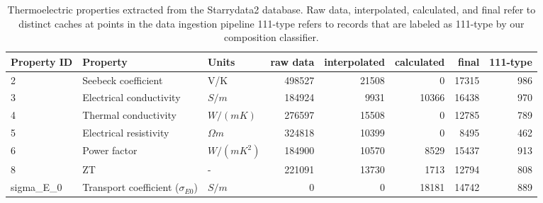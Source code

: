 \begin{table}
\centering
\caption{Thermoelectric properties extracted from the Starrydata2 database. Raw data, interpolated, calculated, and final refer to distinct caches at points in the data ingestion pipeline 111-type refers to records that are labeled as 111-type by our composition classifier.}
\label{table:prop_table}
\begin{tabular}{lllrrrrr}
\toprule
Property ID &                              Property &      Units &  raw data &  interpolated &  calculated &  final &  111-type \\
\midrule
          2 &                   Seebeck coefficient &        V/K &    498527 &         21508 &           0 &  17315 &       986 \\
          3 &               Electrical conductivity &      $S/m$ &    184924 &          9931 &       10366 &  16438 &       970 \\
          4 &                  Thermal conductivity &   $W/(mK)$ &    276597 &         15508 &           0 &  12785 &       789 \\
          5 &                Electrical resistivity & $\Omega m$ &    324818 &         10399 &           0 &   8495 &       462 \\
          6 &                          Power factor & $W/(mK^2)$ &    184900 &         10570 &        8529 &  15437 &       913 \\
          8 &                                    ZT &          - &    221091 &         13730 &        1713 &  12794 &       808 \\
sigma\_E\_0 & Transport coefficient ($\sigma_{E0}$) &      $S/m$ &         0 &             0 &       18181 &  14742 &       889 \\
\bottomrule
\end{tabular}
\end{table}
